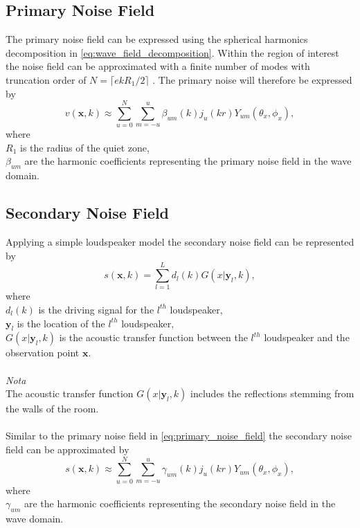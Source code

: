 \subsection{Primary Noise Field}
The primary noise field can be expressed using the spherical harmonics decomposition in \ref{eq:wave_field_decomposition}. Within the region of interest the noise field can be approximated with a finite number of modes with truncation order of $N = \lceil ekR_1/2\rceil$ \cite{Kennedy2007}. The primary noise will therefore be expressed by
\begin{equation}
    v(\mathbf{x},k) \approx \sum_{u=0}^N \sum_{m=-u}^u\beta_{um}(k)j_u(kr)Y_{um}(\theta_x,\phi_x),
    \label{eq:primary_noise_field}
\end{equation}
where\\
$R_1$ is the radius of the quiet zone,\\
$\beta_{um}$ are the harmonic coefficients representing the primary noise field in the wave domain.


\subsection{Secondary Noise Field}
Applying a simple loudspeaker model the secondary noise field can be represented by \cite{Zhang2019}
\begin{equation}
    s(\mathbf{x},k) = \sum_{l=1}^Ld_l(k)G(x|\mathbf{y}_l,k),
    \label{eq:secondary_noise_field_atf}
\end{equation}
where\\
$d_l(k)$ is the driving signal for the $l^{th}$ loudspeaker,\\
$\mathbf{y}_l$ is the location of the $l^{th}$ loudspeaker,\\
$G(x|\mathbf{y}_l,k)$ is the acoustic transfer function between the $l^{th}$ loudspeaker and the observation point $\mathbf{x}$.\\\\
\textit{Nota}\\
The acoustic transfer function $G(x|\mathbf{y}_l,k)$ includes the reflections stemming from the walls of the room.\\\\
Similar to the primary noise field in \ref{eq:primary_noise_field} the secondary noise field can be approximated by
\begin{equation}
    s(\mathbf{x},k) \approx \sum_{u=0}^N \sum_{m=-u}^u\gamma_{um}(k)j_u(kr)Y_{um}(\theta_x,\phi_x),
    \label{eq:secondary_noise_field}
\end{equation}
where\\
$\gamma_{um}$ are the harmonic coefficients representing the secondary noise field in the wave domain.\\\\

